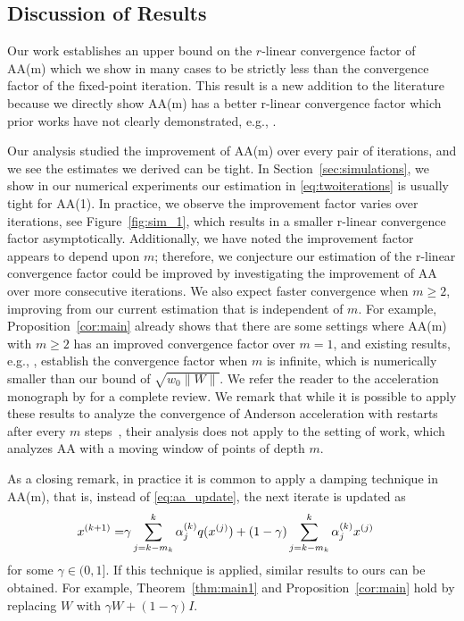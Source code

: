 \documentclass[11pt]{article}
\begin{document}
\subsection{Discussion of Results}\label{sec:discussion}
Our work establishes an upper bound on the $r$-linear convergence factor of AA(m) which we show in many cases to be strictly less than the convergence factor of the fixed-point iteration. 
This result is a new addition to the literature because we directly show AA(m) has a better {\color{black} r-linear convergence factor} which prior works have not clearly demonstrated, e.g., \cite{Evans2020,doi:10.1137/21M1449579,pollock2021anderson,pollock2019anderson}. 

Our analysis studied the improvement of AA(m) over every pair of iterations, and we see the estimates we derived can be tight. In Section~\ref{sec:simulations}, we show in our numerical experiments our estimation in \eqref{eq:twoiterations} is usually tight for AA(1).
In practice, we observe the improvement factor varies over iterations, see Figure~\ref{fig:sim_1}, which results in a smaller r-linear convergence factor asymptotically. Additionally, we have noted the improvement factor appears to depend upon $m$; therefore, we conjecture our estimation of the r-linear convergence factor could be improved by investigating the improvement of AA over more consecutive iterations. We also expect faster convergence when $m\geq 2$, improving from our current estimation that is independent of $m$. For example, Proposition~\ref{cor:main} already shows that there are some settings where AA(m) with $m\geq 2$ has an improved convergence factor over $m=1$, and existing results, e.g., \cite{scieur2019generalized}, establish the convergence factor when $m$ is infinite, which is numerically smaller than our {\color{black}bound} of $\sqrt{w_0\|W\|}${. 
We refer the reader to the acceleration monograph by \cite{OPT-036} for a complete review. We remark that while it is possible to apply these results to analyze the convergence of Anderson acceleration with restarts after every $m$ steps~\cite[eq. (3)]{pmlr-v130-bertrand21a}, their analysis does not apply to the setting of work, which analyzes AA with a moving window of points of depth $m$.}

As a closing remark, in practice it is common to apply a damping technique in AA(m), that is, instead of \eqref{eq:aa_update}, the next iterate is updated as
\begin{align*}
x^{(k+1)}=&{\color{black}\gamma}\sum_{j=k-m_k}^{k}\alpha_j^{(k)} q(x^{(j)}) + (1-{\color{black}\gamma})\sum_{j=k-m_k}^{k}\alpha_j^{(k)} x^{(j)}
\end{align*}
for some {\color{black}$\gamma \in (0,1]$.} If this technique is applied, similar results to ours can be obtained. For example, Theorem~\ref{thm:main1} and Proposition~\ref{cor:main} hold by replacing $W$ with {\color{black}$\gamma W+(1-\gamma)I$.}
\end{document}
